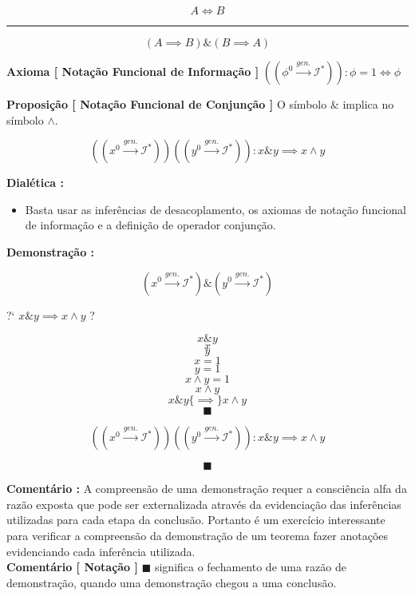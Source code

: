 \documentclass[10pt,a4paper]{report}
\begin{document}
$$ A \iff B $$
\hrule
$$ (A \implies B) \&  (B \implies A )$$

\textbf{Axioma [ Notação Funcional de Informação ]} $ (( \phi^0 \overset{gen.}{\rightarrow} \mathcal{I}^* )) : \phi = 1 \iff \phi $

\hspace{\baselineskip}

\textbf{Proposição [ Notação Funcional de Conjunção ]} O símbolo $\&$ implica no símbolo $\wedge$.

$$ ((x^0 \overset{gen.}{\rightarrow} \mathcal{I}^*)) ((y^0 \overset{gen.}{\rightarrow} \mathcal{I}^*)) : x \& y \implies x \wedge y  $$

\textbf{Dialética :} 

\begin{itemize}
	\item[ ] Basta usar as inferências de desacoplamento, os axiomas de notação funcional de informação e a definição de operador conjunção.
\end{itemize}

\textbf{Demonstração :}

$$ (x^0 \overset{gen.}{\rightarrow} \mathcal{I}^*) \& (y^0 \overset{gen.}{\rightarrow} \mathcal{I}^*)  $$

?` $ x \& y \implies x \wedge y  $  ?

$$ x \& y $$
$$ x $$
$$ y $$
$$ x = 1 $$
$$ y = 1 $$
$$ x \wedge y = 1 $$
$$ x \wedge y $$
$$ x\& y \{ \implies \} x \wedge y $$
$$ \blacksquare $$

$$ ((x^0 \overset{gen.}{\rightarrow} \mathcal{I}^*)) ((y^0 \overset{gen.}{\rightarrow} \mathcal{I}^*)) : x \& y \implies x \wedge y  $$

$$ \blacksquare $$

\textbf{Comentário :} A compreensão de uma demonstração requer a consciência alfa da razão exposta que pode ser externalizada através da evidenciação das inferências utilizadas para cada etapa da conclusão. Portanto é um exercício interessante para verificar a compreensão da demonstração de um teorema fazer anotações evidenciando cada inferência utilizada.\\

\textbf{Comentário [ Notação ]} $ \blacksquare $ significa o fechamento de uma razão de demonstração, quando uma demonstração chegou a uma conclusão.\\
\end{document}

